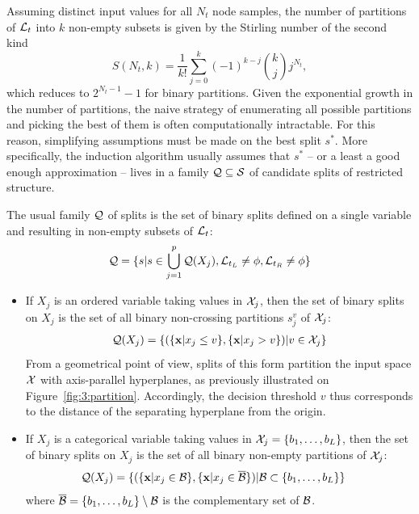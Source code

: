 Assuming distinct input values for all $N_t$ node samples, the number of partitions of ${\cal L}_t$ into $k$
non-empty subsets is given by the Stirling number of the second
kind~\citep{knuth:1992}
\begin{equation}
S(N_t, k) = \frac{1}{k!} \sum_{j=0}^k (-1)^{k-j} {k\choose j} j^{N_t},
\end{equation}
which reduces to $2^{N_t-1}-1$ for binary partitions. Given the exponential
growth in the number of partitions, the naive strategy of enumerating all
possible partitions and picking the best of them is often computationally
intractable. For this reason, simplifying  assumptions must be made on the best
split $s^*$. More specifically, the induction algorithm usually assumes that
$s^*$ -- or a least a good enough approximation -- lives in a family ${\cal Q}
\subseteq {\cal S}$ of candidate splits of restricted structure.

The usual family ${\cal Q}$ of
splits is the set of binary splits defined on a single variable and resulting
in non-empty subsets of ${\cal L}_t$:
\begin{equation}\label{eqn:q:single-variables}
{\cal Q} = \{s | s \in \bigcup_{j=1}^p {\cal Q}(X_j), {\cal L}_{t_L} \neq \phi, {\cal L}_{t_R} \neq \phi \}
\end{equation}
\begin{itemize}
\item If $X_j$ is an ordered variable taking values in ${\cal X}_j$, then the set of binary splits on $X_j$ is the set
of all binary non-crossing partitions $s^v_j$ of ${\cal X}_j$:
\begin{align}
{\cal Q}(X_j) = \{ (\{ \mathbf{x} | x_j \leq v \}, \{ \mathbf{x} | x_j > v \}) | v \in {\cal X}_j \} \label{eqn:q:ordered}
\end{align}
From a geometrical point of view, splits of this form partition the input space
${\cal X}$ with axis-parallel hyperplanes, as previously illustrated on
Figure~\ref{fig:3:partition}. Accordingly, the decision threshold $v$ thus
corresponds to the distance of the separating hyperplane from the origin.
\item If $X_j$ is a categorical variable taking values in ${\cal X}_j = \{ b_1, \dots, b_L \}$, then the set of binary splits on
$X_j$ is the set of all binary  non-empty partitions of ${\cal X}_j$:
\begin{align}\label{eqn:q:categorical-cart}
{\cal Q}(X_j) = \{ (\{\mathbf{x} | x_j \in {\cal B} \}, \{\mathbf{x} | x_j \in \overline{\cal B}\}) | &{\cal B} \subset \{ b_1, \dots, b_L \} \}
\end{align}
where $\overline{\cal B} = \{ b_1, \dots, b_L \} \setminus {\cal B}$ is the complementary set of ${\cal B}$.
\end{itemize}

